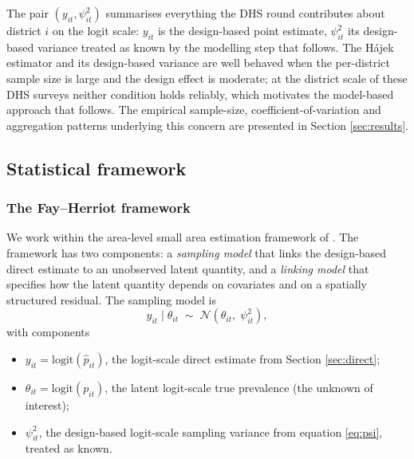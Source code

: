 \documentclass{article}
\begin{document}
The pair \((y_{it}, \psi_{it}^{2})\) summarises everything the DHS round
contributes about district \(i\) on the logit scale: \(y_{it}\) is the
design-based point estimate, \(\psi_{it}^{2}\) its design-based variance
treated as known by the modelling step that follows. The Hájek estimator
and its design-based variance are well behaved when the per-district
sample size is large and the design effect is moderate; at the district
scale of these DHS surveys neither condition holds reliably, which
motivates the model-based approach that follows. The empirical
sample-size, coefficient-of-variation and aggregation patterns
underlying this concern are presented in Section \ref{sec:results}.

\subsection{Statistical framework}\label{statistical-framework}

\label{sec:framework}

\subsubsection{The Fay--Herriot
framework}\label{the-fayherriot-framework}

\label{sec:fh}

We work within the area-level small area estimation framework of
\citep{fay1979}. The framework has two components: a \emph{sampling
model} that links the design-based direct estimate to an unobserved
latent quantity, and a \emph{linking model} that specifies how the
latent quantity depends on covariates and on a spatially structured
residual. The sampling model is \begin{equation}
y_{it} \mid \theta_{it} \;\sim\; \mathcal{N}\!\left( \theta_{it}, \; \psi_{it}^{2} \right),
\label{eq:fh-lik}
\end{equation} with components

\begin{itemize}
\item $y_{it} = \mathrm{logit}(\hat{p}_{it})$, the logit-scale direct estimate from Section \ref{sec:direct};
\item $\theta_{it} = \mathrm{logit}(p_{it})$, the latent logit-scale true prevalence (the unknown of interest);
\item $\psi_{it}^{2}$, the design-based logit-scale sampling variance from equation \ref{eq:psi}, treated as known.
\end{itemize}
\end{document}
